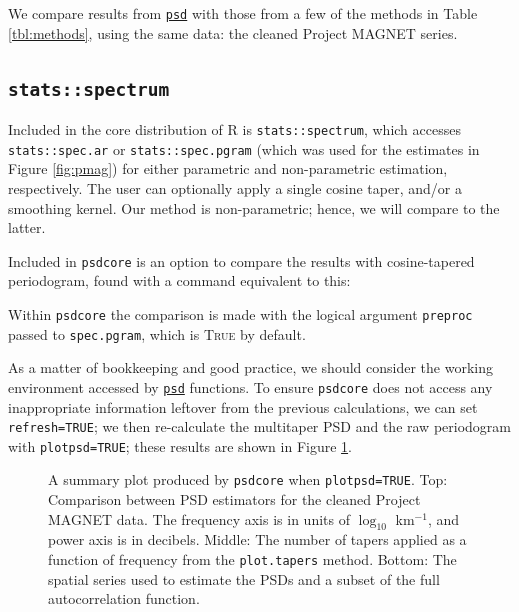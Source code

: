 \documentclass[10pt]{article}\usepackage[]{graphicx}\usepackage[]{color}
\newcommand{\SC}[1]{\textsc{#1}}
\newcommand{\Rcmd}[1]{\texttt{#1}}
\newcommand{\psd}[0]{\href{http://www.github.com/abarbour/psd/}{\color{blue}\Rcmd{psd}}}
\begin{document}


We compare results from
\psd{} with those from a few of the methods in Table \ref{tbl:methods},
using the same data: the cleaned Project MAGNET series.

\subsection{\Rcmd{stats::spectrum}}

Included in the core distribution of R is \Rcmd{stats::spectrum}, which
accesses \Rcmd{stats::spec.ar} or \Rcmd{stats::spec.pgram} (which was used
for the estimates in Figure \ref{fig:pmag}) for either
parametric and non-parametric estimation, respectively.  
The user can optionally apply a single cosine taper, and/or a smoothing kernel.
Our method is non-parametric; hence, we will compare to the latter.

Included in \Rcmd{psdcore} is an option to compare the 
results with cosine-tapered periodogram,
found with a command equivalent to this:

Within \Rcmd{psdcore} the comparison is made with the logical argument \Rcmd{preproc} 
passed to \Rcmd{spec.pgram}, which is \SC{True} by default.

As a matter of bookkeeping and good practice, we should consider the working environment
accessed by \psd{} functions. 
To ensure \Rcmd{psdcore} does not access any inappropriate information leftover
from the previous calculations, we can set \Rcmd{refresh=TRUE}; we then 
re-calculate the multitaper PSD and the raw periodogram with \Rcmd{plotpsd=TRUE}; these
results are shown in Figure \ref{fig:two}.

\begin{figure}[!htbp]
\begin{center}

\caption{A summary plot produced by \Rcmd{psdcore} when
\Rcmd{plotpsd=TRUE}.  
Top: Comparison between PSD estimators for the 
cleaned Project MAGNET data. The frequency axis is in units of $\log_{10}$ km$^{-1}$,
and power axis is in decibels.
%
Middle: The number of tapers applied as a function of frequency from
the \Rcmd{plot.tapers} method. 
%
Bottom: The spatial series used to estimate the PSDs and a subset
of the full autocorrelation function.}
\label{fig:two}
\end{center}
\end{figure}

\clearpage
\end{document}
